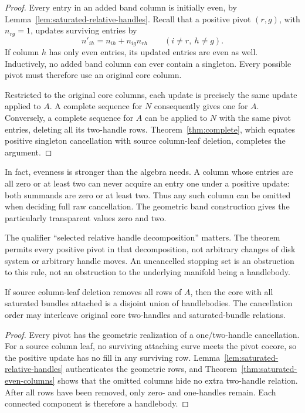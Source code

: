 \begin{proof}
Every entry in an added band column is initially even, by
Lemma~\ref{lem:saturated-relative-handles}.  Recall that a positive
pivot $(r,g)$, with $n_{rg}=1$, updates surviving entries by
\[
 n'_{ih}=n_{ih}+n_{ig}n_{rh}
 \qquad(i\ne r,\ h\ne g).
\]
If column $h$ has only even entries, its updated entries are even as
well.  Inductively, no added band column can ever contain a singleton.
Every possible pivot must therefore use an original core column.

Restricted to the original core columns, each update is precisely the
same update applied to $A$.  A complete sequence for $N$ consequently
gives one for $A$.  Conversely, a complete sequence for $A$ can be applied
to $N$ with the same pivot entries, deleting all its two-handle rows.
Theorem~\ref{thm:complete}, which equates positive singleton cancellation
with source column-leaf deletion, completes the argument.
\end{proof}

In fact, evenness is stronger than the algebra needs. A column whose
entries are all zero or at least two can never acquire an entry one under
a positive update: both summands are zero or at least two. Thus any such
column can be omitted when deciding full raw cancellation. The geometric
band construction gives the particularly transparent values zero and two.

The qualifier ``selected relative handle decomposition'' matters.
The theorem permits every positive pivot in that decomposition, not
arbitrary changes of disk system or arbitrary handle moves.  An
uncancelled stopping set is an obstruction to this rule, not an
obstruction to the underlying manifold being a handlebody.

\begin{corollary}
\label{cor:saturated-handlebody}
If source column-leaf deletion removes all rows of $A$, then the core
with all saturated bundles attached is a disjoint union of
handlebodies.  The cancellation order may interleave original core
two-handles and saturated-bundle relations.
\end{corollary}

\begin{proof}
Every pivot has the geometric realization of a one/two-handle
cancellation.  For a source column leaf, no surviving attaching curve
meets the pivot cocore, so the positive update has no fill in any
surviving row.  Lemma~\ref{lem:saturated-relative-handles} authenticates
the geometric rows, and Theorem~\ref{thm:saturated-even-columns} shows
that the omitted columns hide no extra two-handle relation.  After all
rows have been removed, only zero- and one-handles remain.  Each
connected component is therefore a handlebody.
\end{proof}


